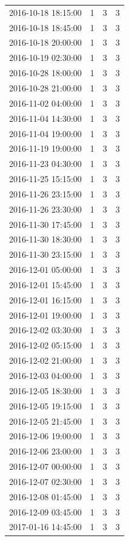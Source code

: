 \begin{tabular}{lrrr}
2016-10-18 18:15:00 & 1 & 3 & 3 \\
2016-10-18 18:45:00 & 1 & 3 & 3 \\
2016-10-18 20:00:00 & 1 & 3 & 3 \\
2016-10-19 02:30:00 & 1 & 3 & 3 \\
2016-10-28 18:00:00 & 1 & 3 & 3 \\
2016-10-28 21:00:00 & 1 & 3 & 3 \\
2016-11-02 04:00:00 & 1 & 3 & 3 \\
2016-11-04 14:30:00 & 1 & 3 & 3 \\
2016-11-04 19:00:00 & 1 & 3 & 3 \\
2016-11-19 19:00:00 & 1 & 3 & 3 \\
2016-11-23 04:30:00 & 1 & 3 & 3 \\
2016-11-25 15:15:00 & 1 & 3 & 3 \\
2016-11-26 23:15:00 & 1 & 3 & 3 \\
2016-11-26 23:30:00 & 1 & 3 & 3 \\
2016-11-30 17:45:00 & 1 & 3 & 3 \\
2016-11-30 18:30:00 & 1 & 3 & 3 \\
2016-11-30 23:15:00 & 1 & 3 & 3 \\
2016-12-01 05:00:00 & 1 & 3 & 3 \\
2016-12-01 15:45:00 & 1 & 3 & 3 \\
2016-12-01 16:15:00 & 1 & 3 & 3 \\
2016-12-01 19:00:00 & 1 & 3 & 3 \\
2016-12-02 03:30:00 & 1 & 3 & 3 \\
2016-12-02 05:15:00 & 1 & 3 & 3 \\
2016-12-02 21:00:00 & 1 & 3 & 3 \\
2016-12-03 04:00:00 & 1 & 3 & 3 \\
2016-12-05 18:30:00 & 1 & 3 & 3 \\
2016-12-05 19:15:00 & 1 & 3 & 3 \\
2016-12-05 21:45:00 & 1 & 3 & 3 \\
2016-12-06 19:00:00 & 1 & 3 & 3 \\
2016-12-06 23:00:00 & 1 & 3 & 3 \\
2016-12-07 00:00:00 & 1 & 3 & 3 \\
2016-12-07 02:30:00 & 1 & 3 & 3 \\
2016-12-08 01:45:00 & 1 & 3 & 3 \\
2016-12-09 03:45:00 & 1 & 3 & 3 \\
2017-01-16 14:45:00 & 1 & 3 & 3 \\

\end{tabular}

